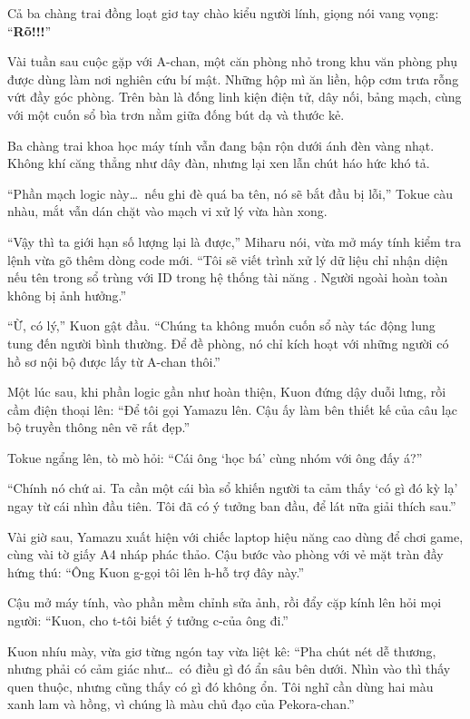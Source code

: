 \documentclass[../main.tex]{subfiles}
\begin{document}
Cả ba chàng trai đồng loạt giơ tay chào kiểu người lính, giọng nói vang vọng: ``\textbf{Rõ!!!}''

Vài tuần sau cuộc gặp với A-chan, một căn phòng nhỏ trong khu văn phòng phụ được dùng làm nơi nghiên cứu bí mật. Những hộp mì ăn liền, hộp cơm trưa rỗng vứt đầy góc phòng. Trên bàn là đống linh kiện điện tử, dây nối, bảng mạch, cùng với một cuốn sổ bìa trơn nằm giữa đống bút dạ và thước kẻ.

Ba chàng trai khoa học máy tính vẫn đang bận rộn dưới ánh đèn vàng nhạt. Không khí căng thẳng như dây đàn, nhưng lại xen lẫn chút háo hức khó tả.

``Phần mạch logic này\dots\ nếu ghi đè quá ba tên, nó sẽ bắt đầu bị lỗi,'' Tokue càu nhàu, mắt vẫn dán chặt vào mạch vi xử lý vừa hàn xong.

``Vậy thì ta giới hạn số lượng lại là được,'' Miharu nói, vừa mở máy tính kiểm tra lệnh vừa gõ thêm dòng code mới. ``Tôi sẽ viết trình xử lý dữ liệu chỉ nhận diện nếu tên trong sổ trùng với ID trong hệ thống tài năng \hll. Người ngoài hoàn toàn không bị ảnh hưởng.''

``Ừ, có lý,'' Kuon gật đầu. ``Chúng ta không muốn cuốn sổ này tác động lung tung đến người bình thường. Để đề phòng, nó chỉ kích hoạt với những người có hồ sơ nội bộ được lấy từ A-chan thôi.''

Một lúc sau, khi phần logic gần như hoàn thiện, Kuon đứng dậy duỗi lưng, rồi cầm điện thoại lên: ``Để tôi gọi Yamazu lên. Cậu ấy làm bên thiết kế của câu lạc bộ truyền thông nên vẽ rất đẹp.''

Tokue ngẩng lên, tò mò hỏi: ``Cái ông `học bá' cùng nhóm với ông đấy á?''

``Chính nó chứ ai. Ta cần một cái bìa sổ khiến người ta cảm thấy `có gì đó kỳ lạ' ngay từ cái nhìn đầu tiên. Tôi đã có ý tưởng ban đầu, để lát nữa giải thích sau.''

Vài giờ sau, Yamazu xuất hiện với chiếc laptop hiệu năng cao dùng để chơi game, cùng vài tờ giấy A4 nháp phác thảo. Cậu bước vào phòng với vẻ mặt tràn đầy hứng thú: ``Ông Kuon g-gọi tôi lên h-hỗ trợ đây này.''

Cậu mở máy tính, vào phần mềm chỉnh sửa ảnh, rồi đẩy cặp kính lên hỏi mọi người: ``Kuon, cho t-tôi biết ý tưởng c-của ông đi.''

Kuon nhíu mày, vừa giơ từng ngón tay vừa liệt kê: ``Pha chút nét dễ thương, nhưng phải có cảm giác như\dots\ có điều gì đó ẩn sâu bên dưới. Nhìn vào thì thấy quen thuộc, nhưng cũng thấy có gì đó không ổn. Tôi nghĩ cần dùng hai màu xanh lam và hồng, vì chúng là màu chủ đạo của Pekora-chan.''
\end{document}
